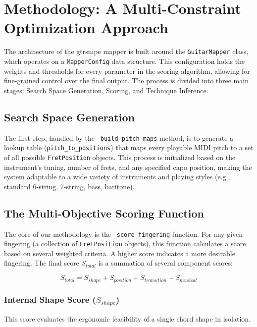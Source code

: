 \documentclass[conference]{IEEEtran}
\begin{document}
\section{Methodology: A Multi-Constraint Optimization Approach}

The architecture of the gtrsnipe mapper is built around the \texttt{GuitarMapper} class, which operates on a \texttt{MapperConfig} data structure. This configuration holds the weights and thresholds for every parameter in the scoring algorithm, allowing for fine-grained control over the final output. The process is divided into three main stages: Search Space Generation, Scoring, and Technique Inference.

\subsection{Search Space Generation}

The first step, handled by the \texttt{\_build\_pitch\_maps} method, is to generate a lookup table (\texttt{pitch\_to\_positions}) that maps every playable MIDI pitch to a set of all possible \texttt{FretPosition} objects. This process is initialized based on the instrument's tuning, number of frets, and any specified capo position, making the system adaptable to a wide variety of instruments and playing styles (e.g., standard 6-string, 7-string, bass, baritone).

\subsection{The Multi-Objective Scoring Function}

The core of our methodology is the \texttt{\_score\_fingering} function. For any given fingering (a collection of \texttt{FretPosition} objects), this function calculates a score based on several weighted criteria. A higher score indicates a more desirable fingering. The final score $S_{total}$ is a summation of several component scores:

\begin{equation}
S_{total} = S_{shape} + S_{position} + S_{transition} + S_{musical}
\end{equation}

\subsubsection{Internal Shape Score ($S_{shape}$)}
This score evaluates the ergonomic feasibility of a single chord shape in isolation.
\end{document}
